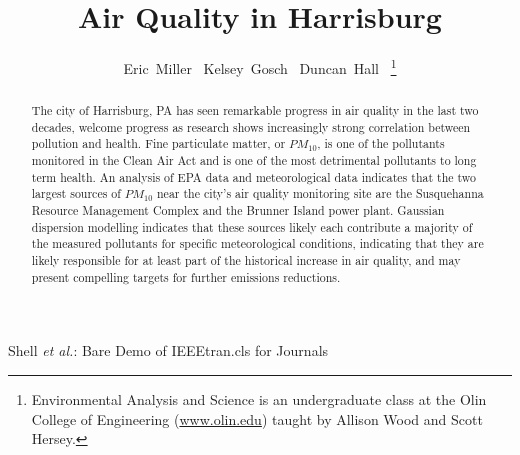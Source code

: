 \documentclass[11pt,journal]{IEEEtran}
\begin{document}
%
\title{Air Quality in Harrisburg}

\author{Eric~Miller~
        Kelsey~Gosch~%
        Duncan~Hall~%
\thanks{Environmental Analysis and Science is an undergraduate class at the Olin College of Engineering (\url{www.olin.edu}) taught by Allison Wood and Scott Hersey.}%
}

%
{Shell \MakeLowercase{\textit{et al.}}: Bare Demo of IEEEtran.cls for Journals}






\maketitle

 \begin{abstract}
The city of Harrisburg, PA has seen remarkable progress in air quality in the last two decades, welcome progress as research shows increasingly strong correlation between pollution and health. Fine particulate matter, or $PM_{10}$, is one of the pollutants monitored in the Clean Air Act and is one of the most detrimental pollutants to long term health. An analysis of EPA data and meteorological data indicates that the two largest sources of $PM_{10}$ near the city’s air quality monitoring site are the Susquehanna Resource Management Complex and the Brunner Island power plant. Gaussian dispersion modelling indicates that these sources likely each contribute a majority of the measured pollutants for specific meteorological conditions, indicating that they are likely responsible for at least part of the historical increase in air quality, and may present compelling targets for further emissions reductions.


\end{abstract}


\IEEEpeerreviewmaketitle
\end{document}
